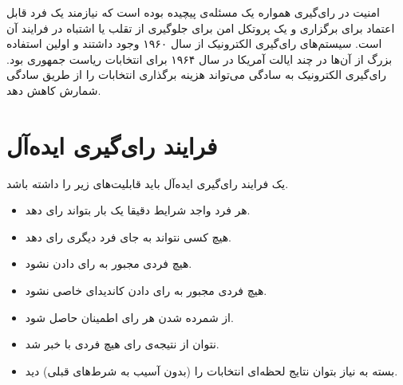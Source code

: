 \par
امنیت در رای‌گیری همواره یک مسئله‌ی پیچیده بوده است که نیازمند یک فرد قابل اعتماد برای برگزاری و یک پروتکل امن برای جلوگیری از تقلب یا اشتباه در فرایند آن است. سیستم‌های رای‌گیری الکترونیک 
از سال ۱۹۶۰ وجود داشتند و اولین استفاده‌ بزرگ از آن‌ها در چند ایالت آمریکا در سال ۱۹۶۴ برای انتخابات ریاست جمهوری بود. رای‌گیری الکترونیک به سادگی می‌تواند هزینه برگذاری انتخابات را از طریق سادگی شمارش کاهش دهد. 

\section{فرایند رای‌گیری ایده‌آل}
\par
یک فرایند رای‌گیری ایده‌آل باید قابلیت‌‌های زیر را داشته باشد.
\begin{itemize}
	\item 
	هر فرد واجد شرایط دقیقا یک بار بتواند رای دهد.
	\item 
	هیچ کسی نتواند به جای فرد دیگری رای دهد.
	\item 
  	هیچ فردی مجبور به رای دادن نشود.
  	\item 
  	هیچ فردی مجبور به رای دادن کاندیدای خاصی نشود.
  	\item 
  	از شمرده شدن هر رای اطمینان حاصل شود.
  	\item 
  	نتوان از نتیجه‌ی رای هیچ فردی با خبر شد.
  	\item 
  	بسته به نیاز بتوان نتایج لحظه‌ای انتخابات را (بدون آسیب به شرط‌های قبلی) دید.
\end{itemize}

